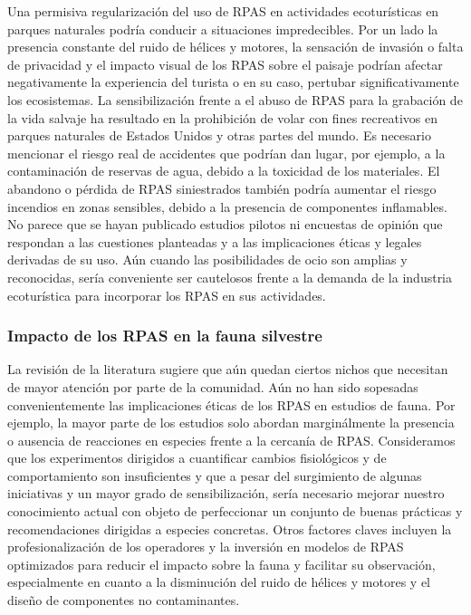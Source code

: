 \documentclass[onecolumn]{extarticle}
\begin{document}
Una permisiva regularización del uso de RPAS en actividades
ecoturísticas en parques naturales podría conducir a situaciones
impredecibles. Por un lado la presencia constante del ruido de hélices y
motores, la sensación de invasión o falta de privacidad y el impacto
visual de los RPAS sobre el paisaje podrían afectar negativamente la
experiencia del turista o en su caso, pertubar significativamente los
ecosistemas. La sensibilización frente a el abuso de RPAS para la
grabación de la vida salvaje ha resultado en la prohibición de volar con
fines recreativos en parques naturales de Estados Unidos y otras partes
del mundo. Es necesario mencionar el riesgo real de accidentes que
podrían dan lugar, por ejemplo, a la contaminación de reservas de agua,
debido a la toxicidad de los materiales. El abandono o pérdida de RPAS
siniestrados también podría aumentar el riesgo incendios en zonas
sensibles, debido a la presencia de componentes inflamables. No parece
que se hayan publicado estudios pilotos ni encuestas de opinión que
respondan a las cuestiones planteadas y a las implicaciones éticas y
legales derivadas de su uso. Aún cuando las posibilidades de ocio son
amplias y reconocidas, sería conveniente ser cautelosos frente a la
demanda de la industria ecoturística para incorporar los RPAS en sus
actividades.

\subsubsection{Impacto de los RPAS en la fauna
silvestre}\label{impacto-de-los-rpas-en-la-fauna-silvestre-1}

La revisión de la literatura sugiere que aún quedan ciertos nichos que
necesitan de mayor atención por parte de la comunidad. Aún no han sido
sopesadas convenientemente las implicaciones éticas de los RPAS en
estudios de fauna. Por ejemplo, la mayor parte de los estudios solo
abordan marginálmente la presencia o ausencia de reacciones en especies
frente a la cercanía de RPAS. Consideramos que los experimentos
dirigidos a cuantificar cambios fisiológicos y de comportamiento son
insuficientes y que a pesar del surgimiento de algunas iniciativas y un
mayor grado de sensibilización, sería necesario mejorar nuestro
conocimiento actual con objeto de perfeccionar un conjunto de buenas
prácticas y recomendaciones dirigidas a especies concretas. Otros
factores claves incluyen la profesionalización de los operadores y la
inversión en modelos de RPAS optimizados para reducir el impacto sobre
la fauna y facilitar su observación, especialmente en cuanto a la
disminución del ruido de hélices y motores y el diseño de componentes no
contaminantes.
\end{document}
